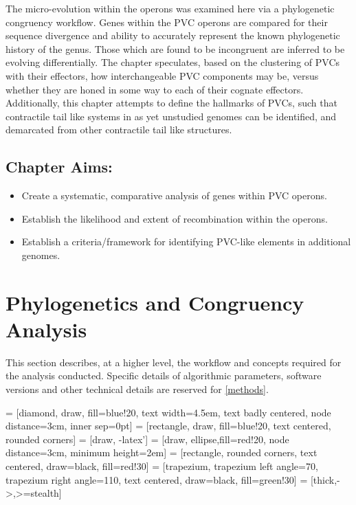 The micro-evolution within the operons was examined here via a phylogenetic congruency workflow. Genes within the PVC operons are compared for their sequence divergence and ability to accurately represent the known phylogenetic history of the genus. Those which are found to be incongruent are inferred to be evolving differentially. The chapter speculates, based on the clustering of PVCs with their effectors, how interchangeable PVC components may be, versus whether they are honed in some way to each of their cognate effectors. Additionally, this chapter attempts to define the hallmarks of PVCs, such that contractile tail like systems in as yet unstudied genomes can be identified, and demarcated from other contractile tail like structures.

\subsection*{Chapter Aims:}
\begin{itemize}
	\item Create a systematic, comparative analysis of genes within PVC operons.
	\item Establish the likelihood and extent of recombination within the operons.
	\item Establish a criteria/framework for identifying PVC-like elements in additional genomes.
\end{itemize}

\section{Phylogenetics and Congruency Analysis}
This section describes, at a higher level, the workflow and concepts required for the analysis conducted. Specific details of algorithmic parameters, software versions and other technical details are reserved for \vref{methods}.

\vspace{0.5cm}
 = [diamond, draw, fill=blue!20, text width=4.5em, text badly centered, node distance=3cm, inner sep=0pt]
 = [rectangle, draw, fill=blue!20, text centered, rounded corners]
 = [draw, -latex']
 = [draw, ellipse,fill=red!20, node distance=3cm, minimum height=2em]
 = [rectangle, rounded corners, text centered, draw=black, fill=red!30]
 = [trapezium, trapezium left angle=70, trapezium right angle=110, text centered, draw=black, fill=green!30]
 = [thick,->,>=stealth]

